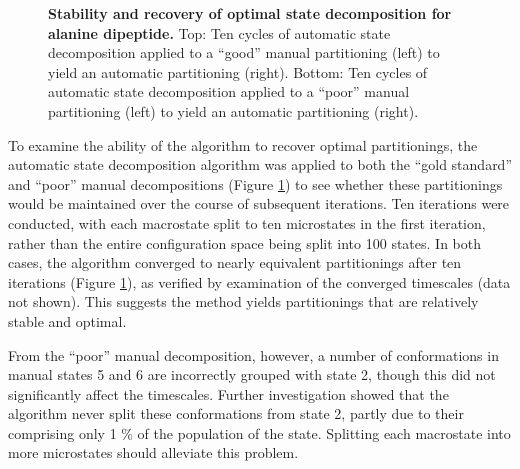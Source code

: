 \begin{figure}[tb]
  \begin{center}
  \end{center}
  \caption{{\bf Stability and recovery of optimal state decomposition for alanine dipeptide.}
  Top: Ten cycles of automatic state decomposition applied to a ``good'' manual partitioning (left) to yield an automatic partitioning (right).
  Bottom: Ten cycles of automatic state decomposition applied to a ``poor'' manual partitioning (left) to yield an automatic partitioning (right).
  }
  \label{figure:alanine-dipeptide-decomposition-stability}
\end{figure}

To examine the ability of the algorithm to recover optimal partitionings, the automatic state decomposition algorithm was applied to both the ``gold standard'' and ``poor'' manual decompositions (Figure \ref{figure:alanine-dipeptide-decomposition-stability}) to see whether these partitionings would be maintained over the course of subsequent iterations.
Ten iterations were conducted, with each macrostate split to ten microstates in the first iteration, rather than the entire configuration space being split into 100 states.
In both cases, the algorithm converged to nearly equivalent partitionings after ten iterations (Figure \ref{figure:alanine-dipeptide-decomposition-stability}), as verified by examination of the converged timescales (data not shown).
This suggests the method yields partitionings that are relatively stable and optimal.

From the ``poor'' manual decomposition, however, a number of conformations in manual states 5 and 6 are incorrectly grouped with state 2, though this did not significantly affect the timescales.
Further investigation showed that the algorithm never split these conformations from state 2, partly due to their comprising only 1 \% of the population of the state.
Splitting each macrostate into more microstates should alleviate this problem.

